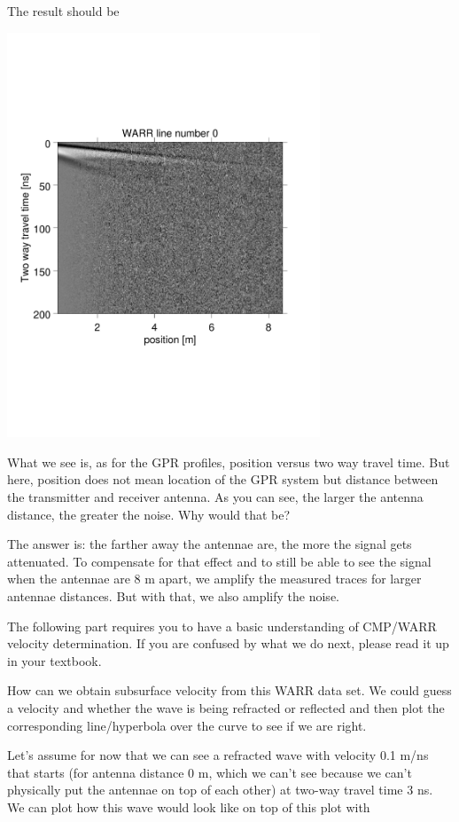 \documentclass[11pt]{article}
\begin{document}
The result should be
\begin{center}
\includegraphics[width=0.7\textwidth, trim = 0.9cm 6cm 2cm
  6.5cm,clip]{figures/WARR}
\end{center}
 
What we see is, as for the GPR profiles, position versus two way
travel time. But here, position does not mean location of the GPR
system but distance between the transmitter and receiver antenna. As
you can see, the larger the antenna distance, the greater the
noise. Why would that be?
 
The answer is: the farther away the antennae are, the more the signal
gets attenuated. To compensate for that effect and to still be able to
see the signal when the antennae are 8 m apart, we amplify the
measured traces for larger antennae distances. But with that, we also
amplify the noise.
 
The following part requires you to have a basic understanding of
CMP/WARR velocity determination. If you are confused by what we do
next, please read it up in your textbook.
 
How can we obtain subsurface velocity from this WARR data set. We
could guess a velocity and whether the wave is being refracted or
reflected and then plot the corresponding line/hyperbola over the
curve to see if we are right.
 
Let's assume for now that we can see a refracted wave with velocity
0.1 m/ns that starts (for antenna distance 0 m, which we can't see
because we can't physically put the antennae on top of each other) at
two-way travel time 3 ns. We can plot how this wave would look like on
top of this plot with
 
\end{document}

